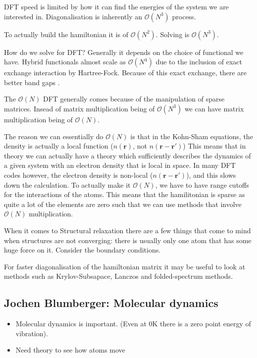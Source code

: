 \documentclass[11pt]{article}
\begin{document}
\begin{enumerate}
DFT speed is limited by how it can find the energies of the system we are
interested in. 
Diagonalisation is inherently an $\mathcal{O}(N^3)$ process. 

To actually build the hamiltonian it is of $\mathcal{O}(N^2)$. 
Solving is $\mathcal{O}(N^3)$. 

How do we solve for DFT?
Generally it depends on the choice of functional we have. 
Hybrid functionals almost scale as $\mathcal{O}(N^4)$ due to the inclusion of exact
exchange interaction by Hartree-Fock. Because of this exact exchange, there
are better band gaps . 

The $\mathcal{O}(N)$ DFT generally comes because of the manipulation of sparse matrices. 
Insead of matrix multiplication being of $\mathcal{O}(N^3)$ we can have matrix
multiplication being of $\mathcal{O}(N)$. 

The reason we can essentially do $\mathcal{O}(N)$ is that in the Kohn-Sham equations, the
density is actually a local function ($n(\mathbf{r})$, not $n(\mathbf{r}-\mathbf{r}')$) 
This means that in theory we can actually have a theory which sufficiently
describes the dynamics of a given system with an electron density that is
local in space. 
In many DFT codes however, the electron density is non-local ($n(
\mathbf{r} - \mathbf{r}')$), and
this slows down the calculation. 
To actually make it $\mathcal{O}(N)$, we have to have range cutoffs for the interactions
of the atoms. This means that the hamilitonian is sparse as quite a lot of the
elements are zero such that we can use methods that involve $\mathcal{O}(N)$
multiplication. 

When it comes to Structural relaxation there are a few things that come to
mind when structures are not converging:
there is usually only one atom that has some huge force on it. 
Consider the boundary conditions. 

For faster diagonalisation of the hamiltonian matrix it may be useful to look
at methods such as Krylov-Subsapace, Lanczos and folded-spectrum methods.
\end{enumerate}

\subsection{Jochen Blumberger: Molecular dynamics}
\label{sec-4-2}

\begin{itemize}
\item Molecular dynamics is important. (Even at 0K there is a zero point energy
of vibration).
\item Need theory to see how atoms move
\end{itemize}
\end{document}
